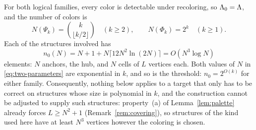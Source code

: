For both logical families, every color is detectable under recoloring, so
$\Lambda_0=\Lambda$, and the number of colors is
\begin{equation}\label{eq:two-parameters}
 N(\Psi_k)=\binom{k}{\lfloor k/2\rfloor}\quad(k\ge2),
 \qquad
 N(\Phi_k)=2^k\quad(k\ge1).
\end{equation}
Each of the structures involved has
\begin{equation}\label{eq:size-threshold}
 n_0(N)=N+1+N\lceil12N^2\ln(2N)\rceil=O(N^3\log N)
\end{equation}
elements: $N$ anchors, the hub, and $N$ cells of $L$ vertices each. Both
values of $N$ in \eqref{eq:two-parameters} are exponential in $k$, and so
is the threshold: $n_0=2^{O(k)}$ for either family. Consequently, nothing
below applies to a target that only has to be correct on structures whose
size is polynomial in $k$, and the construction cannot be adjusted to supply
such structures: property~(a) of Lemma~\ref{lem:palette} already forces
$L\ge N^2+1$ (Remark~\ref{rem:covering}), so structures of the kind used
here have at least $N^3$ vertices however the coloring is chosen.

